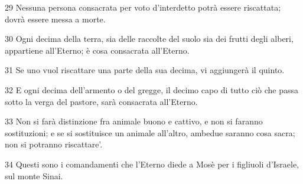 \par 29 Nessuna persona consacrata per voto d'interdetto potrà essere riscattata; dovrà essere messa a morte.
\par 30 Ogni decima della terra, sia delle raccolte del suolo sia dei frutti degli alberi, appartiene all'Eterno; è cosa consacrata all'Eterno.
\par 31 Se uno vuol riscattare una parte della sua decima, vi aggiungerà il quinto.
\par 32 E ogni decima dell'armento o del gregge, il decimo capo di tutto ciò che passa sotto la verga del pastore, sarà consacrata all'Eterno.
\par 33 Non si farà distinzione fra animale buono e cattivo, e non si faranno sostituzioni; e se si sostituisce un animale all'altro, ambedue saranno cosa sacra; non si potranno riscattare'.
\par 34 Questi sono i comandamenti che l'Eterno diede a Mosè per i figliuoli d'Israele, sul monte Sinai.



